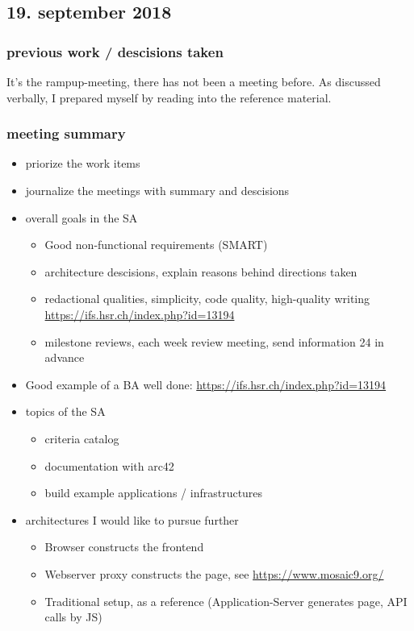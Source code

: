 
\subsection{19. september 2018}

\subsubsection{previous work / descisions taken}
It's the rampup-meeting, there has not been a meeting before. As discussed verbally, I prepared myself by reading into the reference material.

\subsubsection{meeting summary}

\begin{itemize}
    \item priorize the work items
    \item journalize the meetings with summary and descisions
    \item overall goals in the SA
        \begin{itemize}
            \item Good non-functional requirements (SMART)
            \item architecture descisions, explain reasons behind directions taken
            \item redactional qualities, simplicity, code quality, high-quality writing \url{https://ifs.hsr.ch/index.php?id=13194}
            \item milestone reviews, each week review meeting, send information 24 in advance 
        \end{itemize}
    \item Good example of a BA well done: \url{https://ifs.hsr.ch/index.php?id=13194}
    \item topics of the SA
        \begin{itemize}
            \item criteria catalog
            \item documentation with arc42
            \item build example applications / infrastructures 
        \end{itemize}
    \item architectures I would like to pursue further
        \begin{itemize}
            \item Browser constructs the frontend
            \item Webserver proxy constructs the page, see \url{https://www.mosaic9.org/}
            \item Traditional setup, as a reference (Application-Server generates page, API calls by JS)
        \end{itemize}
\end{itemize}

